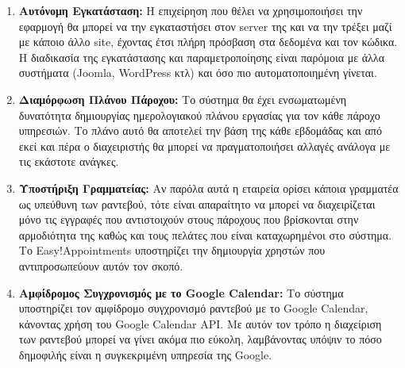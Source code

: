 \begin{enumerate}
\item {\bf Αυτόνομη Εγκατάσταση:} Η επιχείρηση που θέλει να χρησιμοποιήσει την εφαρμογή θα μπορεί να την εγκαταστήσει στον server της και να την τρέξει μαζί με κάποιο άλλο site, έχοντας έτσι πλήρη πρόσβαση στα δεδομένα και τον κώδικα. Η διαδικασία της εγκατάστασης και παραμετροποίησης είναι παρόμοια με άλλα συστήματα (Joomla, WordPress κτλ) και όσο πιο αυτοματοποιημένη γίνεται.

\item {\bf Διαμόρφωση Πλάνου Πάροχου:} Το σύστημα θα έχει ενσωματωμένη δυνατότητα δημιουργίας ημερολογιακού πλάνου εργασίας για τον κάθε πάροχο υπηρεσιών. Το πλάνο αυτό θα αποτελεί την βάση της κάθε εβδομάδας και από εκεί και πέρα ο διαχειριστής θα μπορεί να πραγματοποιήσει αλλαγές ανάλογα με τις εκάστοτε ανάγκες. 

\item {\bf Υποστήριξη Γραμματείας:} Αν παρόλα αυτά η εταιρεία ορίσει κάποια γραμματέα ως υπεύθυνη των ραντεβού, τότε είναι απαραίτητο να μπορεί να διαχειρίζεται μόνο τις εγγραφές που αντιστοιχούν στους πάροχους που βρίσκονται στην αρμοδιότητα της καθώς και τους πελάτες που είναι καταχωρημένοι στο σύστημα. Το Easy!Appointments υποστηρίζει την δημιουργία χρηστών που αντιπροσωπεύουν αυτόν τον σκοπό.

\item {\bf Αμφίδρομος Συγχρονισμός με το Google Calendar:} Το σύστημα υποστηρίζει τον αμφίδρομο συγχρονισμό ραντεβού με το Google Calendar, κάνοντας χρήση του Google Calendar API. Με αυτόν τον τρόπο η διαχείριση των ραντεβού μπορεί να γίνει ακόμα πιο εύκολη, λαμβάνοντας υπόψιν το πόσο δημοφιλής είναι η συγκεκριμένη υπηρεσία της Google.
\end{enumerate}

